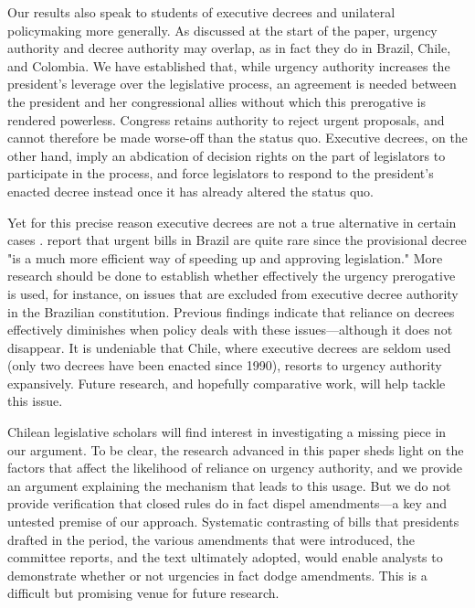 \documentclass[letter,12pt]{article}
\begin{document}
Our results also speak to students of executive decrees and unilateral policymaking more generally. As discussed at the start of the paper, urgency authority and decree authority may overlap, as in fact they do in Brazil, Chile, and Colombia. We have established that, while urgency authority increases the president's leverage over the legislative process, an agreement is needed between the president and her congressional allies without which this prerogative is rendered powerless. Congress retains authority to reject urgent proposals, and cannot therefore be made worse-off than the status quo. Executive decrees, on the other hand, imply an abdication of decision rights on the part of legislators to participate in the process, and force legislators to respond to the president's enacted decree instead once it has already altered the status quo.

Yet for this precise reason executive decrees are not a true alternative in certain cases \citep{palanza.2019}. \citet[][, 164]{figueiredo.limongi.2000} report that urgent bills in Brazil are quite rare since the provisional decree "is a much more efficient way of speeding up and approving legislation." More research should be done to establish whether effectively the urgency prerogative is used, for instance, on issues that are excluded from executive decree authority in the Brazilian constitution. Previous findings indicate that reliance on decrees effectively diminishes when policy deals with these issues---although it does not disappear. It is undeniable that Chile, where executive decrees are seldom used (only two decrees have been enacted since 1990), resorts to urgency authority expansively. Future research, and hopefully comparative work, will help tackle this issue. 

Chilean legislative scholars will find interest in investigating a missing piece in our argument. To be clear, the research advanced in this paper sheds light on the factors that affect the likelihood of reliance on urgency authority, and we provide an argument explaining the mechanism that leads to this usage. But we do not provide verification that closed rules do in fact dispel amendments---a key and untested premise of our approach. Systematic contrasting of bills that presidents drafted in the period, the various amendments that were introduced, the committee reports, and the text ultimately adopted, would enable analysts to demonstrate whether or not urgencies in fact dodge amendments. This is a difficult but promising venue for future research. 
\end{document}
